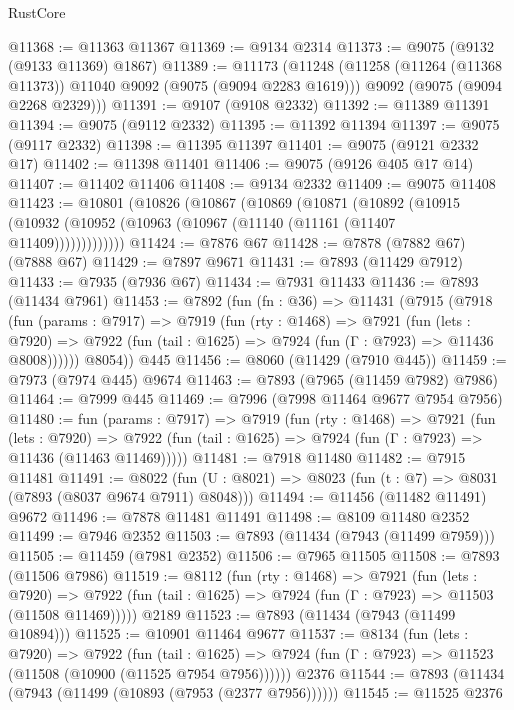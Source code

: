 \begin{lexlean}{RustCore}
\begin{coremodule}
@11368 := @11363 @11367
@11369 := @9134 @2314
@11373 := @9075 (@9132 (@9133 @11369) @1867)
@11389 := @11173
    (@11248
      (@11258 (@11264 (@11368 @11373)) @11040 @9092 (@9075 (@9094 @2283 @1619)))
      @9092
      (@9075 (@9094 @2268 @2329)))
@11391 := @9107 (@9108 @2332)
@11392 := @11389 @11391
@11394 := @9075 (@9112 @2332)
@11395 := @11392 @11394
@11397 := @9075 (@9117 @2332)
@11398 := @11395 @11397
@11401 := @9075 (@9121 @2332 @17)
@11402 := @11398 @11401
@11406 := @9075 (@9126 @405 @17 @14)
@11407 := @11402 @11406
@11408 := @9134 @2332
@11409 := @9075 @11408
@11423 := @10801
    (@10826
      (@10867
        (@10869
          (@10871
            (@10892
              (@10915 (@10932 (@10952 (@10963 (@10967 (@11140 (@11161 (@11407 @11409)))))))))))))
@11424 := @7876 @67
@11428 := @7878 (@7882 @67) (@7888 @67)
@11429 := @7897 @9671
@11431 := @7893 (@11429 @7912)
@11433 := @7935 (@7936 @67)
@11434 := @7931 @11433
@11436 := @7893 (@11434 @7961)
@11453 := @7892
    (fun (fn : @36) =>
    @11431
      (@7915
        (@7918
          (fun (params : @7917) =>
          @7919
            (fun (rty : @1468) =>
            @7921
              (fun (lets : @7920) =>
              @7922 (fun (tail : @1625) => @7924 (fun (Γ : @7923) => @11436 @8008))))))
        @8054))
    @445
@11456 := @8060 (@11429 (@7910 @445))
@11459 := @7973 (@7974 @445) @9674
@11463 := @7893 (@7965 (@11459 @7982) @7986)
@11464 := @7999 @445
@11469 := @7996 (@7998 @11464 @9677 @7954 @7956)
@11480 := fun (params : @7917) =>
  @7919
    (fun (rty : @1468) =>
    @7921
      (fun (lets : @7920) =>
      @7922 (fun (tail : @1625) => @7924 (fun (Γ : @7923) => @11436 (@11463 @11469)))))
@11481 := @7918 @11480
@11482 := @7915 @11481
@11491 := @8022 (fun (U : @8021) => @8023 (fun (t : @7) => @8031 (@7893 (@8037 @9674 @7911) @8048)))
@11494 := @11456 (@11482 @11491) @9672
@11496 := @7878 @11481 @11491
@11498 := @8109 @11480 @2352
@11499 := @7946 @2352
@11503 := @7893 (@11434 (@7943 (@11499 @7959)))
@11505 := @11459 (@7981 @2352)
@11506 := @7965 @11505
@11508 := @7893 (@11506 @7986)
@11519 := @8112
    (fun (rty : @1468) =>
    @7921
      (fun (lets : @7920) =>
      @7922 (fun (tail : @1625) => @7924 (fun (Γ : @7923) => @11503 (@11508 @11469)))))
    @2189
@11523 := @7893 (@11434 (@7943 (@11499 @10894)))
@11525 := @10901 @11464 @9677
@11537 := @8134
    (fun (lets : @7920) =>
    @7922
      (fun (tail : @1625) =>
      @7924 (fun (Γ : @7923) => @11523 (@11508 (@10900 (@11525 @7954 @7956))))))
    @2376
@11544 := @7893 (@11434 (@7943 (@11499 (@10893 (@7953 (@2377 @7956))))))
@11545 := @11525 @2376

\end{coremodule}
\end{lexlean}
